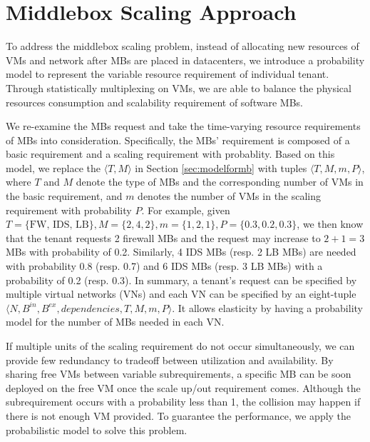 \documentclass[review]{elsarticle}
\begin{document}
\section{Middlebox Scaling Approach}\label{sec:scalibility}
To address the middlebox scaling problem, instead of allocating new resources of VMs and network after MBs are placed in datacenters, we introduce a probability model to represent the variable resource requirement of individual tenant. Through statistically multiplexing on VMs, we are able to balance the physical resources consumption and scalability requirement of software MBs. 

We re-examine the MBs request and take the time-varying resource requirements of MBs into consideration. Specifically, the MBs' requirement is composed of a basic requirement and a scaling requirement with probablity. Based on this model, we replace the $\langle T, M \rangle$ in Section \ref{sec:modelformb} with tuples $\langle T, M, m, P\rangle$, where $T$ and $M$  denote the type of MBs and the corresponding number of VMs in the basic requirement, and $m$ denotes the number of VMs in the scaling requirement with probability $P$. For example, given $T=\{\text{FW, IDS, LB}\}, M=\{ 2, 4, 2\}, m=\{1, 2, 1\}, P=\{0.3, 0.2, 0.3\}$, we then know that the tenant requests 2 firewall MBs and the request may increase to $2+1=3$ MBs with probability of 0.2. Similarly, 4 IDS MBs (resp. 2 LB MBs) are needed with probability 0.8 (resp. 0.7) and 6 IDS MBs (resp. 3 LB MBs) with a probability of 0.2 (resp. 0.3). In summary, a tenant's request can be specified by multiple virtual networks (VNs) and each VN can be specified by an eight-tuple $\langle N, B^{in}, B^{ex}, dependencies, T, M, m, P\rangle$. It allows elasticity by having a probability model for the number of MBs needed in each VN. 

If multiple units of the scaling requirement do not occur simultaneously, we can provide few redundancy to tradeoff between utilization and availability. By sharing free VMs between variable subrequirements, a specific MB can be soon deployed on the free VM once the scale up/out requirement comes. Although the subrequirement occurs with a probability less than 1, the collision may happen if there is not enough VM provided. To guarantee the performance, we apply the probabilistic model to solve this problem. 
\end{document}

